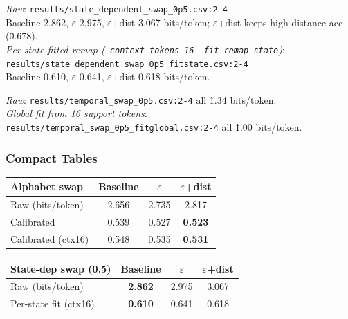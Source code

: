 \documentclass[11pt]{article}
\begin{document}
\begin{notebox}
\textit{Raw}: \texttt{results/state\_dependent\_swap\_0p5.csv:2-4} \\
Baseline 2.862, $\varepsilon$ 2.975, $\varepsilon$+dist 3.067 bits/token; $\varepsilon$+dist keeps high distance acc (\~0.678).\\
\textit{Per-state fitted remap (\texttt{--context-tokens 16 --fit-remap state})}: \texttt{results/state\_dependent\_swap\_0p5\_fitstate.csv:2-4} \\
Baseline 0.610, $\varepsilon$ 0.641, $\varepsilon$+dist 0.618 bits/token.
\end{notebox}

\begin{notebox}
\textit{Raw}: \texttt{results/temporal\_swap\_0p5.csv:2-4} \; all \~1.34 bits/token.\\
\textit{Global fit from 16 support tokens}: \texttt{results/temporal\_swap\_0p5\_fitglobal.csv:2-4} \; all \~1.00 bits/token.
\end{notebox}

\subsubsection{Compact Tables}
\vspace{-0.5em}
\begin{center}
\begin{tabular}{lccc}
\toprule
Alphabet swap & Baseline & $\varepsilon$ & $\varepsilon$+dist \\
\midrule
Raw (bits/token) & 2.656 & 2.735 & 2.817 \\
Calibrated & 0.539 & 0.527 & \textbf{0.523} \\
Calibrated (ctx16) & 0.548 & 0.535 & \textbf{0.531} \\
\bottomrule
\end{tabular}
\end{center}

\vspace{-0.75em}
\begin{center}
\begin{tabular}{lccc}
\toprule
State-dep swap (0.5) & Baseline & $\varepsilon$ & $\varepsilon$+dist \\
\midrule
Raw (bits/token) & \textbf{2.862} & 2.975 & 3.067 \\
Per-state fit (ctx16) & \textbf{0.610} & 0.641 & 0.618 \\
\bottomrule
\end{tabular}
\end{center}
\end{document}
